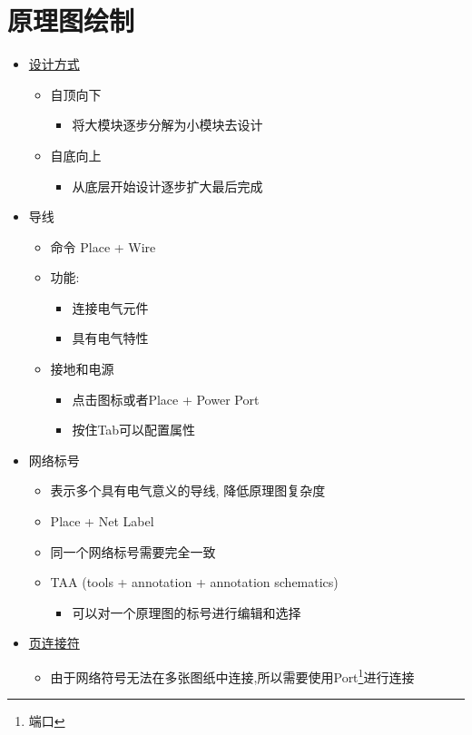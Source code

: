 \documentclass[11pt]{article}
\begin{document}
\section{原理图绘制}
\label{sec:org4a515e5}
\begin{itemize}
\item \uline{设计方式}
\begin{itemize}
\item 自顶向下
\begin{itemize}
\item 将大模块逐步分解为小模块去设计
\end{itemize}
\item 自底向上
\begin{itemize}
\item 从底层开始设计逐步扩大最后完成
\end{itemize}
\end{itemize}
\item 导线
\begin{itemize}
\item 命令 Place + Wire
\item 功能:
\begin{itemize}
\item 连接电气元件
\item 具有电气特性
\end{itemize}
\item 接地和电源
\begin{itemize}
\item 点击图标或者Place + Power Port
\item 按住Tab可以配置属性
\end{itemize}
\end{itemize}
\item 网络标号
\begin{itemize}
\item 表示多个具有电气意义的导线, 降低原理图复杂度
\item Place + Net Label
\item 同一个网络标号需要完全一致
\item TAA (tools + annotation + annotation schematics)
\begin{itemize}
\item 可以对一个原理图的标号进行编辑和选择
\end{itemize}
\end{itemize}
\item \uline{页连接符}
\begin{itemize}
\item 由于网络符号无法在多张图纸中连接,所以需要使用Port\footnote{端口}进行连接

\end{itemize}
\end{itemize}
\end{document}
